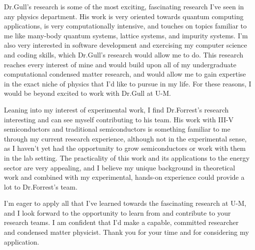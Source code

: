 \documentclass[11pt]{article}
\newcommand{\schoolabbr}{U-M}
\begin{document}
Dr.\@ Gull's research is some of the most exciting, fascinating research I've seen in any physics department. His work is very oriented towards quantum computing applications, is very computationally intensive, and touches on topics familiar to me like many-body quantum systems, lattice systems, and impurity systems. I'm also very interested in software development and exercising my computer science and coding skills, which Dr.\@ Gull's research would allow me to do. This research reaches every interest of mine and would build upon all of my undergraduate computational condensed matter research, and would allow me to gain expertise in the exact niche of physics that I'd like to pursue in my life. For these reasons, I would be beyond excited to work with Dr.\@ Gull at U-M.

Leaning into my interest of experimental work, I find Dr.\@ Forrest's research interesting and can see myself contributing to his team. His work with III-V semiconductors and traditional semiconductors is something familiar to me through my current research experience, although not in the experimental sense, as I haven't yet had the opportunity to grow semiconductors or work with them in the lab setting. The practicality of this work and its applications to the energy sector are very appealing, and I believe my unique background in theoretical work and combined with my experimental, hands-on experience could provide a lot to Dr.\@ Forrest's team.

I'm eager to apply all that I've learned towards the fascinating research at \schoolabbr{}, and I look forward to the opportunity to learn from and contribute to your research teams. I am confident that I'd make a capable, committed researcher and condensed matter physicist. Thank you for your time and for considering my application.
\end{document}

